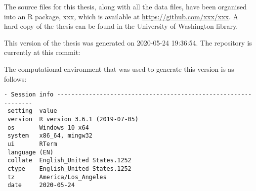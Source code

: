 \documentclass [11pt, proquest] {uwthesis}[2015/03/03]
\begin{document}
The source files for this thesis, along with all the data files, have
been organised into an R package, xxx, which is available at
\url{https://github.com/xxx/xxx}. A hard copy of the thesis can be found
in the University of Washington library.

This version of the thesis was generated on 2020-05-24 19:36:54. The
repository is currently at this commit:

The computational environment that was used to generate this version is
as follows:
\begin{verbatim}
- Session info ---------------------------------------------------------------
 setting  value                       
 version  R version 3.6.1 (2019-07-05)
 os       Windows 10 x64              
 system   x86_64, mingw32             
 ui       RTerm                       
 language (EN)                        
 collate  English_United States.1252  
 ctype    English_United States.1252  
 tz       America/Los_Angeles         
 date     2020-05-24                  


\end{verbatim}
\end{document}
